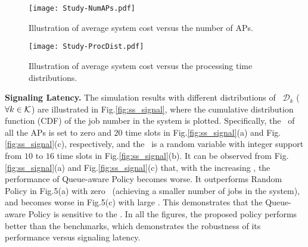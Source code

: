 \begin{figure}[hbt]                                                 %
    \centering                                                      %
    \texttt{[image: Study-NumAPs.pdf]}        %
    \caption{Illustration of average system cost versus the number of APs.}
    \label{fig:ss_scale}                                            %
\end{figure}                                                        %

\begin{figure}[hbt]                                                 %
    \centering                                                      %
    \texttt{[image: Study-ProcDist.pdf]}      %
    \caption{Illustration of average system cost versus the processing time distributions.}
    \label{fig:ss_dist}                                             %
\end{figure}                                                        %


\textbf{Signaling Latency.}
The simulation results with different distributions of \brlatency~$\mathcal{D}_{k}$ ($\forall k\in\mathcal{K}$) are illustrated in Fig.\ref{fig:ss_signal}, where the cumulative distribution function (CDF) of the job number in the system is plotted.
Specifically, the \brlatency~of all the APs is set to zero and $20$ time slots in Fig.\ref{fig:ss_signal}(a) and Fig.\ref{fig:ss_signal}(c), respectively, and the \brlatency~is a random variable with integer support from $10$ to $16$ time slots in Fig.\ref{fig:ss_signal}(b).
It can be observed from Fig.\ref{fig:ss_signal}(a) and Fig.\ref{fig:ss_signal}(c) that, with the increasing \brlatency, the performance of Queue-aware Policy becomes worse.
It outperforms Random Policy in Fig.5(a) with zero \brlatency~(achieving a smaller number of jobs in the system), and becomes worse in Fig.5(c) with large \brlatency.
This demonstrates that the Queue-aware Policy is sensitive to the \brlatency.
In all the figures, the proposed policy performs better than the benchmarks, which demonstrates the robustness of its performance versus signaling latency.

